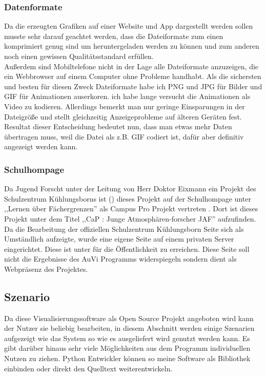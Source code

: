 \subsubsection{Datenformate} %
Da die erzeugten Grafiken auf einer Website und App dargestellt werden sollen
musste sehr darauf geachtet werden,
dass die Dateiformate zum einen komprimiert genug sind
um heruntergeladen werden zu können und zum anderen
noch einen gewissen Qualitätsstandard erfüllen.\\
Außerdem sind Mobiltelefone nicht in der Lage alle
Dateiformate anzuzeigen,
die ein Webbrowser auf einem Computer ohne Probleme handhabt.
Als die sichersten und besten für diesen Zweck Dateiformate habe
ich PNG und JPG für Bilder
und GIF für Animationen auserkoren.
ich habe lange versucht die Animationen als Video zu kodieren.
Allerdings bemerkt man nur geringe Einsparungen in der
Dateigröße und stellt gleichzeitig Anzeigeprobleme auf
älteren Geräten fest.
Resultat dieser Entscheidung bedeutet nun, dass man etwas mehr
Daten übertragen muss, weil die Datei als z.B. GIF codiert ist,
dafür aber definitiv angezeigt werden kann.

\subsubsection{Schulhompage} %
Da Jugend Forscht unter der Leitung von Herr Doktor Eixmann
ein Projekt des Schulzentrum Kühlungsborns ist
() dieses Projekt auf der Schulhompage
unter ,,Lernen über Fächergrenzen'' als Campus Pro Projekt vertreten \cite{szkb}.
Dort ist dieses Projekt unter dem Titel ,,CaP \jf : Junge Atmosphären-forscher JAF'' aufzufinden.
Da die Bearbeitung der offiziellen Schulzentrum Kühlungsborn Seite sich als Umständlich aufzeigte,
wurde eine eigene Seite auf einem privaten Server eingerichtet.
Diese ist unter 
für die Öffentlichkeit zu erreichen.
Diese Seite soll nicht die Ergebnisse des AuVi Programms
widerspiegeln sondern dient als Webpräsenz des Projektes.

\subsection{Szenario} %
Da diese Visualisierungssoftware als Open Source Projekt angeboten wird kann der Nutzer
sie beliebig bearbeiten, in diesem Abschnitt werden einige Szenarien aufgezeigt wie das System
so wie es ausgeliefert wird genutzt werden kann.
Es gibt darüber hinaus sehr viele Möglichkeiten aus dem Programm individuellen Nutzen zu ziehen.
Python Entwickler können so meine Software als Bibliothek einbinden oder direkt den Quelltext
weiterentwickeln.

